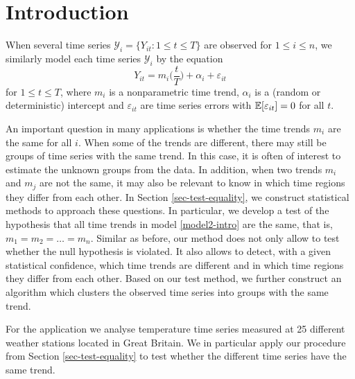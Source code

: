 
\section{Introduction}\label{sec-intro}

When several time series $\mathcal{Y}_i = \{ Y_{it}: 1 \le t \le T \}$ are observed for $1 \le i \le n$, we similarly model each time series $\mathcal{Y}_i$ by the equation
\begin{equation}\label{model2-intro}
Y_{it} = m_i \Big( \frac{t}{T} \Big) + \alpha_i + \varepsilon_{it}
\end{equation}
for $1 \le t \le T$, where $m_i$ is a nonparametric time trend, $\alpha_i$ is a (random or deterministic) intercept and $\varepsilon_{it}$ are time series errors with $\mathbb{E}[\varepsilon_{it}] = 0$ for all $t$.

An important question in many applications is whether the time trends $m_i$ are the same for all $i$. When some of the trends are different, there may still be groups of time series with the same trend. In this case, it is often of interest to estimate the unknown groups from the data. In addition, when two trends $m_i$ and $m_j$ are not the same, it may also be relevant to know in which time regions they differ from each other. In Section \ref{sec-test-equality}, we construct statistical methods to approach these questions. In particular, we develop a test of the hypothesis that all time trends in model \eqref{model2-intro} are the same, that is, $m_1 = m_2 = \ldots = m_n$. Similar as before, our method does not only allow to test whether the null hypothesis is violated. It also allows to detect, with a given statistical confidence, which time trends are different and in which time regions they differ from each other. Based on our test method, we further construct an algorithm which clusters the observed time series into groups with the same trend. 

For the application we analyse temperature time series measured at 25 different weather stations located in Great Britain. We in particular apply our procedure from Section \ref{sec-test-equality} to test whether the different time series have the same trend. 